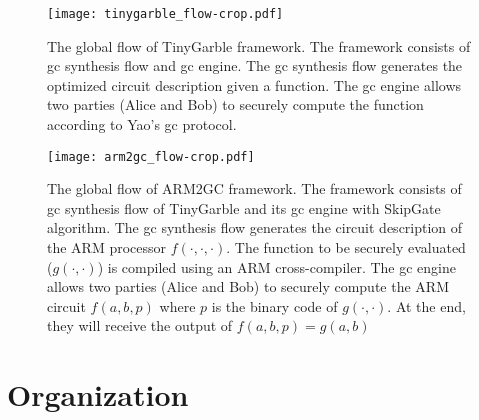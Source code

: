 \begin{figure}[h]
\centering
\texttt{[image: tinygarble\_flow-crop.pdf]}
\caption{The global flow of TinyGarble framework.
The framework consists of \acrshort{gc} synthesis flow and \acrshort{gc} engine.
The \acrshort{gc} synthesis flow generates the optimized circuit description given a function.
The \acrshort{gc} engine allows two parties (Alice and Bob) to securely compute the function according to Yao's \acrshort{gc} protocol.
}
\label{fig:globalflow}
\end{figure}

\begin{figure}[h]
\centering
\texttt{[image: arm2gc\_flow-crop.pdf]}
\caption{The global flow of ARM2GC framework.
The framework consists of \acrshort{gc} synthesis flow of TinyGarble and its \acrshort{gc} engine with SkipGate algorithm.
The \acrshort{gc} synthesis flow generates the circuit description of the ARM processor $f(\cdot,\cdot,\cdot)$.
The function to be securely evaluated ($g(\cdot,\cdot)$) is compiled using an ARM cross-compiler.
The \acrshort{gc} engine allows two parties (Alice and Bob) to securely compute the ARM circuit $f(a,b,p)$ where $p$ is the binary code of $g(\cdot,\cdot)$.
At the end, they will receive the output of $f(a,b,p) = g(a,b)$
}
\label{fig:arm2gc-globalflow}
\end{figure}


\section{Organization}
